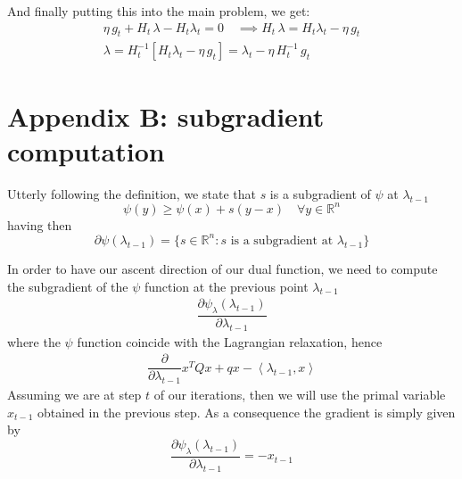 \documentclass[notitlepage]{article}
\begin{document}
And finally putting this into the main problem, we get:
\begin{align*}
  \eta\, g_t + H_t\, \lambda - H_t \lambda_t = 0 \quad \implies H_t\, \lambda = H_t \lambda_t - \eta\, g_t \\
  \lambda = H_t^{-1} \left[ H_t \lambda_t - \eta\, g_t \right] = \lambda_t - \eta\, H_t^{-1}\, g_t
\end{align*}


\section{Appendix B: subgradient computation}

Utterly following the definition, we state that $s$ is a subgradient of $\psi$ at $\lambda_{t-1}$
\[
  \psi(y) \ge \psi(x) + s(y-x) \quad \forall y \in \mathbb{R}^n  
\]
having then 
\[
  \partial \psi(\lambda_{t-1}) = \{ s \in \mathbb{R}^n : s \text{ is a subgradient at } \lambda_{t-1} \}
\]

In order to have our ascent direction of our dual function, we need to compute the subgradient of the $\psi$ function at the previous point $\lambda_{t-1}$
\begin{align*}
  \dfrac{\partial \psi_\lambda(\lambda_{t-1})}{\partial \lambda_{t-1}}
\end{align*}
where the $\psi$ function coincide with the Lagrangian relaxation, hence
\begin{align*}
  \dfrac{\partial}{\partial \lambda_{t-1}} x^T Q x + q x - \left\langle \lambda_{t-1},x \right\rangle
\end{align*}
Assuming we are at step $t$ of our iterations, then we will use the primal variable $x_{t-1}$ obtained in the previous step. As a consequence the gradient is simply given by
\[
  \dfrac{\partial \psi_\lambda(\lambda_{t-1})}{\partial \lambda_{t-1}} = - x_{t-1}
\]
\end{document}
